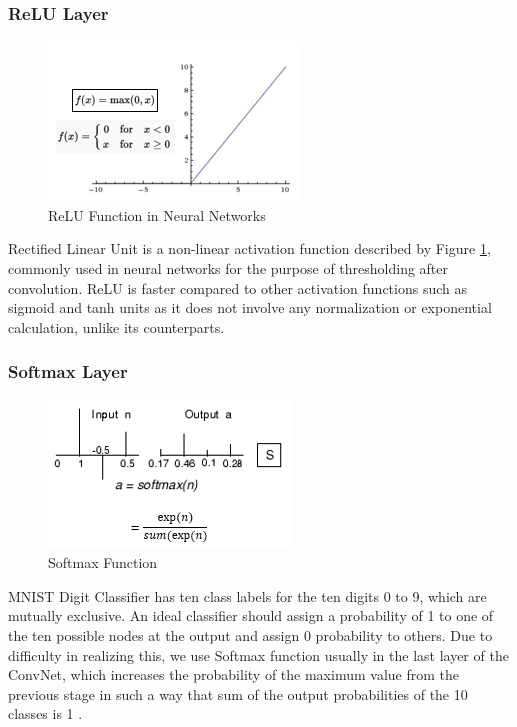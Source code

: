 \subsubsection{ReLU Layer}
\begin{figure}[h!]
  \centering
  \includegraphics[width=0.5\linewidth]{figures/relu.PNG}
  \caption{ReLU Function in Neural Networks
  \cite{wiki_relu}}
  \label{fig:relu}
\end{figure}
Rectified Linear Unit \cite{nair2010rectified} is a non-linear activation function described by Figure \ref{fig:relu}, commonly used in neural networks for the purpose of thresholding after convolution. ReLU is faster compared to other activation functions such as sigmoid and tanh units as it does not involve any normalization or exponential calculation, unlike its counterparts. 
\subsubsection{Softmax Layer}
\begin{figure}[h!]
  \centering
  \includegraphics[width=0.3\linewidth]{figures/softmax.PNG}
  \caption{Softmax Function
  \cite{mathworks_softmax}}
  \label{fig:softmax}
\end{figure}
MNIST Digit Classifier has ten class labels for the ten digits 0 to 9, which are mutually exclusive. An ideal classifier should assign a probability of 1 to one of the ten possible nodes at the output and assign 0 probability to others. Due to difficulty in realizing this, we use Softmax function usually in the last layer of the ConvNet, which increases the probability of the maximum value from the previous stage in such a way that sum of the output probabilities of the 10 classes is 1 \cite{softmax_cmc}.
